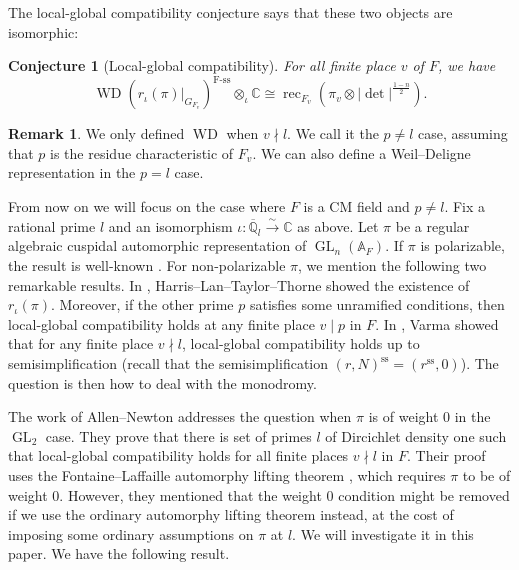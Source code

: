 \documentclass[10pt]{article}
\newtheorem{conj}[theorem]{Conjecture}
\theoremstyle{definition}
\newtheorem{rmk}[theorem]{Remark}
\numberwithin{equation}{theorem}
\newcommand{\AAA}{\mathbb{A}}
\newcommand{\CC}{\mathbb{C}}
\newcommand{\QQ}{\mathbb{Q}}
\DeclareMathOperator{\Fss}{F-ss}
\DeclareMathOperator{\GL}{GL}
\DeclareMathOperator{\rec}{rec}
\DeclareMathOperator{\Ss}{ss}
\DeclareMathOperator{\WD}{WD}
\begin{document}
The local-global compatibility conjecture says that these two objects are isomorphic:
\begin{conj}[Local-global compatibility]
For all finite place $v$ of $F$, we have
$$\WD(r_\iota(\pi)|_{G_{F_v}})^{\Fss}\otimes_\iota\CC\cong\rec_{F_v}(\pi_v\otimes|\det|^{\frac{1-n}{2}}).$$
\end{conj}

\begin{rmk}
We only defined $\WD$ when $v\nmid l$. We call it the $p\ne l$ case, assuming that $p$ is the residue characteristic of $F_v$. We can also define a Weil--Deligne representation in the $p=l$ case.
\end{rmk}

From now on we will focus on the case where $F$ is a CM field and $p\ne l$. Fix a rational prime $l$ and an isomorphism $\iota: \overline{\QQ}_l\xrightarrow{\sim}\CC$ as above. Let $\pi$ be a regular algebraic cuspidal automorphic representation of $\GL_n(\AAA_F)$. If $\pi$ is polarizable, the result is well-known \cite{Car12}. For non-polarizable $\pi$, we mention the following two remarkable results. In \cite{HLTT16}, Harris--Lan--Taylor--Thorne showed the existence of $r_\iota(\pi)$. Moreover, if the other prime $p$ satisfies some unramified conditions, then local-global compatibility holds at any finite place $v\mid p$ in $F$. In \cite{Var14}, Varma showed that for any finite place $v\nmid l$, local-global compatibility holds up to semisimplification (recall that the semisimplification $(r,N)^{\Ss}=(r^{\Ss},0)$). The question is then how to deal with the monodromy.

The work of Allen--Newton \cite[Theorem~4.1]{AN19} addresses the question when $\pi$ is of weight $0$ in the $\GL_2$ case. They prove that there is set of primes $l$ of Dircichlet density one such that local-global compatibility holds for all finite places $v\nmid l$ in $F$. Their proof uses the Fontaine--Laffaille automorphy lifting theorem \cite[Theorem~6.1.1]{ACC+18}, which requires $\pi$ to be of weight $0$. However, they mentioned that the weight $0$ condition might be removed if we use the ordinary automorphy lifting theorem \cite[Theorem~6.1.2]{ACC+18} instead, at the cost of imposing some ordinary assumptions on $\pi$ at $l$. We will investigate it in this paper. We have the following result.
\end{document}

